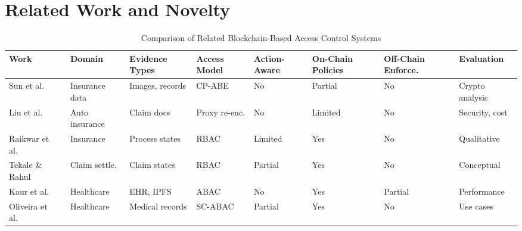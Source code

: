 \documentclass[pdflatex,sn-mathphys-num]{sn-jnl}
\begin{document}
\section{Related Work and Novelty}
\label{rel}
\begin{table}[!htbp]
	\centering
	\caption{Comparison of Related Blockchain-Based Access Control Systems}\label{tab:comparison}
    \small
	\setlength{\tabcolsep}{3.5pt}
	\begin{tabular}{@{}p{2.5cm}p{1.8cm}p{2cm}p{1.8cm}p{1.6cm}p{1.4cm}p{1.4cm}p{1.8cm}@{}}
		\toprule
		\textbf{Work}                                   & \textbf{Domain}         & \textbf{Evidence Types}                     & \textbf{Access Model}    & \textbf{Action-Aware} & \textbf{On-Chain Policies} & \textbf{Off-Chain Enforce.} & \textbf{Evaluation}   \\
		\midrule
		Sun et al.~\cite{sun2020insurance}              & Insurance data          & Images, records                             & CP-ABE                   & No                    & Partial                    & No                          & Crypto analysis       \\
		\addlinespace[0.5ex]
		Liu et al.~\cite{liu2021auto}                   & Auto insurance          & Claim docs                                  & Proxy re-enc.            & No                    & Limited                    & No                          & Security, cost        \\
		\addlinespace[0.5ex]
		Raikwar et al.~\cite{raikwar2018insurance}      & Insurance               & Process states                              & RBAC                     & Limited               & Yes                        & No                          & Qualitative           \\
		\addlinespace[0.5ex]
		Tekale \& Rahul~\cite{tekale2023claims}         & Claim settle.           & Claim states                                & RBAC                     & Partial               & Yes                        & No                          & Conceptual            \\
		\addlinespace[0.5ex]
		Kaur et al.~\cite{kaur2024ehrabac}              & Healthcare              & EHR, IPFS                                   & ABAC                     & No                    & Yes                        & Partial                     & Performance           \\
		\addlinespace[0.5ex]
		Oliveira et al.~\cite{oliveira2022smartaccess}  & Healthcare              & Medical records                             & SC-ABAC                  & Partial               & Yes                        & No                          & Use cases             \\

\end{tabular}
\end{table}
\end{document}
